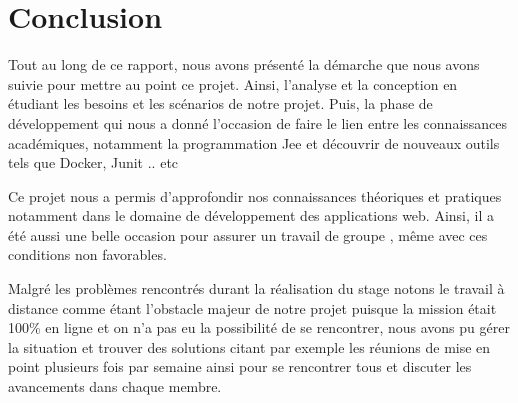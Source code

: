 \chapter*{Conclusion}
\vspace{2cm}
\par Tout au long de ce rapport, nous avons présenté la démarche que nous avons suivie pour mettre au point ce projet. Ainsi, l'analyse et la conception en étudiant les besoins et les scénarios de notre projet. Puis, la phase de développement qui nous a donné l’occasion de faire le lien entre les connaissances académiques, notamment la programmation Jee et découvrir de nouveaux outils tels que Docker, Junit .. etc\\

\par Ce projet nous a permis d’approfondir nos connaissances théoriques et pratiques notamment dans le domaine de développement des applications web. Ainsi, il a été aussi une belle occasion pour assurer un travail de groupe , même avec ces conditions non favorables.
\\ \par
Malgré les problèmes rencontrés durant la réalisation du stage notons le travail à distance comme étant l'obstacle majeur de notre projet puisque la mission était 100\% en ligne et on n'a pas eu la possibilité de se rencontrer, nous avons pu gérer la situation et trouver des solutions citant par exemple les réunions de mise en point plusieurs fois par semaine ainsi pour se rencontrer tous et discuter les avancements dans chaque membre.\\
\newpage